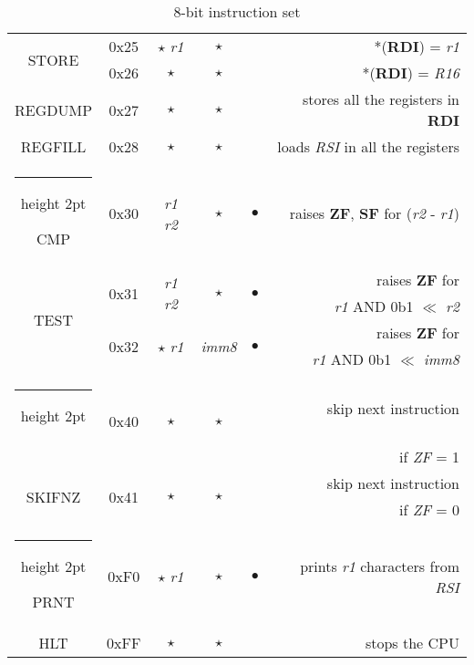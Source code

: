 \documentclass[a4paper,12pt]{article}
\makeatletter
\newcommand{\thickhline}{%
    \noalign {\ifnum 0=`}\fi \hrule height 2pt
    \futurelet \reserved@a \@xhline
}
\makeatother
\begin{document}
\begin{table}[H]
\begin{tabular}{|c|c|c|c|c|r|}
        \hline
        \multirow{2}{*}{STORE} & 0x25 & $\star$ \quad \textit{r1} & $\star$ & & *(\textbf{RDI}) = \textit{r1}\\
        \cline{2-6}
                             & 0x26 & $\star$ & $\star$ & & *(\textbf{RDI}) = \textit{R16}\\
        \hline
        REGDUMP & 0x27 & $\star$ & $\star$ & & stores all the registers in \textbf{RDI}\\
        \hline
        REGFILL & 0x28 & $\star$ & $\star$ & & loads \textit{RSI} in all the registers\\
        \thickhline
        CMP & 0x30 & \textit{r1} \quad \textit{r2} & $\star$ & $\bullet$ & raises \textbf{ZF}, \textbf{SF} for (\textit{r2} - \textit{r1})\\
        \hline
        \multirow{4}{*}{TEST} & \multirow{2}{*}{0x31} & \multirow{2}{*}{\textit{r1} \quad \textit{r2}} & \multirow{2}{*}{$\star$} & \multirow{2}{*}{$\bullet$} & raises \textbf{ZF} for \\
         & & & & & \textit{r1} AND 0b1 $\ll$ \textit{r2}\\
        \cline{2-6}
                             & \multirow{2}{*}{0x32} & \multirow{2}{*}{$\star$ \quad \textit{r1}} & \multirow{2}{*}{\textit{imm8}} & \multirow{2}{*}{$\bullet$} & raises \textbf{ZF} for \\
                             & & & & & \textit{r1} AND 0b1 $\ll$ \textit{imm8}\\
        \thickhline
        \multirow{2}{*}{SKIFZ} & \multirow{2}{*}{0x40} & \multirow{2}{*}{$\star$} & \multirow{2}{*}{$\star$} & & skip next instruction\\
         & & & & & if \textit{ZF} = 1\\
        \cline{2-6}
        \multirow{2}{*}{SKIFNZ} & \multirow{2}{*}{0x41} & \multirow{2}{*}{$\star$} & \multirow{2}{*}{$\star$} & & skip next instruction\\
         & & & & & if \textit{ZF} = 0\\
        \cline{2-6}
        \thickhline

        PRNT & 0xF0 & $\star$ \quad \textit{r1} & $\star$ & $\bullet$ & prints \textit{r1} characters from \textit{RSI}\\
        \hline

        HLT & 0xFF & $\star$ & $\star$ & & stops the CPU\\
        \hline  
    \end{tabular}
    \caption{8-bit instruction set}
    \label{tab:8bit_instructions}
\end{table}
\end{document}
